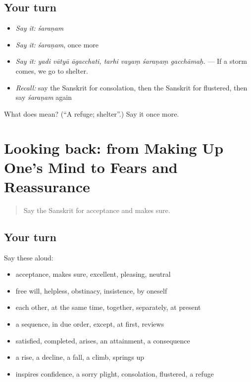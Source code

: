 \subsection*{Your turn}
\begin{itemize}
\raggedright
  \item \emph{Say it:} \emph{śaraṇam}
  \item \emph{Say it:} \emph{śaraṇam}, once more
  \item \emph{Say it:} \emph{yadi vātyā āgacchati, tarhi vayaṃ śaraṇaṃ gacchāmaḥ.} — If a storm comes, we go to shelter.
  \item \emph{Recall:} say the Sanskrit for consolation, then the Sanskrit for flustered, then say \emph{śaraṇam} again
\end{itemize}

\begin{tcolorbox}[breakable,colback=teal!4,colframe=teal!35!black,title={Before you move on}]
What does  mean? (\textquotedblleft{}A refuge; shelter\textquotedblright{}.) Say it once more.
\end{tcolorbox}
\section[(dialogue)]{Looking back: from Making Up One's Mind to Fears and Reassurance}

\label{lesson:SA-R548-review-542-548}



\begin{quote}
Say the Sanskrit for acceptance and makes sure.
\end{quote}

\subsection*{Your turn}
Say these aloud:

\begin{itemize}
\raggedright
  \item acceptance, makes sure, excellent, pleasing, neutral
  \item free will, helpless, obstinacy, insistence, by oneself
  \item each other, at the same time, together, separately, at present
  \item a sequence, in due order, except, at first, reviews
  \item satisfied, completed, arises, an attainment, a consequence
  \item a rise, a decline, a fall, a climb, springs up
  \item inspires confidence, a sorry plight, consolation, flustered, a refuge
\end{itemize}

